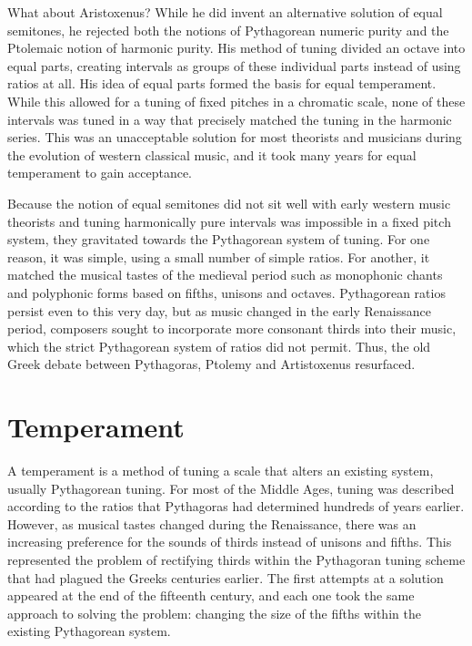 What about Aristoxenus?  While he did invent an alternative solution of equal semitones,
he rejected both the notions of Pythagorean numeric purity and the Ptolemaic notion of
harmonic purity.  His method of tuning divided an octave into equal parts, creating
intervals as groups of these individual parts instead of using ratios at all.  His idea of
equal parts formed the basis for equal temperament.  While this allowed for a tuning of
fixed pitches in a chromatic scale, none of these intervals was tuned in a way that
precisely matched the tuning in the harmonic series.  This was an unacceptable solution
for most theorists and musicians during the evolution of western classical music, and it
took many years for equal temperament to gain acceptance.

Because the notion of equal semitones did not sit well with early western music theorists
and tuning harmonically pure intervals was impossible in a fixed pitch system, they
gravitated towards the Pythagorean system of tuning.  For one reason, it was simple,
using a small number of simple ratios.  For another, it matched
the musical tastes of the medieval period such as monophonic chants and polyphonic forms
based on fifths, unisons and octaves.  Pythagorean ratios persist even to this very day,
but as music changed in the early Renaissance period, composers sought to incorporate more
consonant thirds into their music, which the strict Pythagorean system of ratios did not
permit.  Thus, the old Greek debate between Pythagoras, Ptolemy and
Artistoxenus resurfaced.

\section{Temperament}

A temperament is a method of tuning a scale that alters an existing system, usually
Pythagorean tuning. For most of the Middle Ages, tuning was described according to the
ratios that Pythagoras had determined hundreds of years earlier. However, as musical
tastes changed during the Renaissance, there was an increasing preference for the sounds
of thirds instead of unisons and fifths. This represented the problem of rectifying thirds
within the Pythagoran tuning scheme that had plagued the Greeks centuries earlier. The
first attempts at a solution appeared at the end of the fifteenth century, and each one
took the same approach to solving the problem: changing the size of
the fifths within the existing Pythagorean system.

